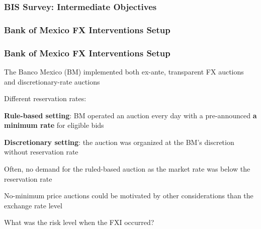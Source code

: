 \documentclass{beamer}
\newenvironment{largeitemize}{\itemize\addtolength{\itemsep}{10pt}}{\enditemize}
\begin{document}
\begin{frame}
  \frametitle{BIS Survey: Intermediate Objectives}
\end{frame}

\begin{frame}
  \frametitle{Bank of Mexico FX Interventions Setup}


  
\end{frame}


\begin{frame}
  \frametitle{Bank of Mexico FX Interventions Setup}  
  \begin{largeitemize}
    \item The Banco Mexico (BM) implemented both ex-ante, transparent FX
      auctions and discretionary-rate auctions
    \item Different reservation rates:
      \begin{largeitemize}
      \item \textbf{Rule-based setting}: BM operated an auction every day
        with a pre-announced \textbf{a minimum rate} for eligible bids
      \item \textbf{Discretionary setting}: the auction was organized at the BM's discretion without reservation rate
      \end{largeitemize}
  \item Often, no demand for the ruled-based auction as the market rate was
    below the reservation rate
  \item No-minimum price auctions could be motivated by other considerations
    than the exchange rate level
  \item What was the risk level when the FXI occurred?
  \end{largeitemize}
\end{frame}
\end{document}
